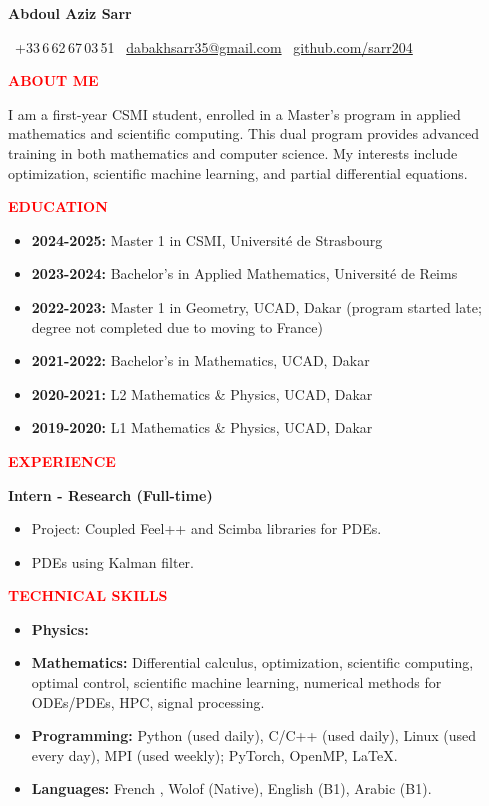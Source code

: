 \documentclass[12pt,a4paper]{article}
\newcommand{\cvsection}[1]{%
  \vspace{10pt}
  \noindent\makebox[\linewidth]{\rule{\textwidth}{1.5pt}}
  \vspace{2pt}
  \noindent\textcolor{red}{\textbf{\LARGE #1}}
  \vspace{2pt}
  \noindent\makebox[\linewidth]{\rule{\textwidth}{0.5pt}}
  \vspace{6pt}
}
\begin{document}
\begin{center}
  {\Huge \textbf{Abdoul Aziz Sarr}}
  
  \faPhone\ +33\,6\,62\,67\,03\,51\quad
  \faEnvelope\ \href{mailto:dabakhsarr35@gmail.com}{dabakhsarr35@gmail.com} \quad
  \faGithub\ \href{https://github.com/sarr204}{github.com/sarr204}
\end{center}

\vspace{10pt}

\cvsection{ABOUT ME}
I am a first-year CSMI student, enrolled in a Master's program in applied mathematics and scientific computing. This dual program provides advanced training in both mathematics and computer science. My interests include optimization, scientific machine learning, and partial differential equations.

\cvsection{EDUCATION}
\begin{itemize}[leftmargin=*,itemsep=3pt]
  \item \textbf{2024-2025:} Master 1 in CSMI, Université de Strasbourg
  \item \textbf{2023-2024:} Bachelor's in Applied Mathematics, Université de Reims
  \item \textbf{2022-2023:} Master 1 in Geometry, UCAD, Dakar (program started late; degree not completed due to moving to France)
  \item \textbf{2021-2022:} Bachelor's in Mathematics, UCAD, Dakar
  \item \textbf{2020-2021:} L2 Mathematics \& Physics, UCAD, Dakar
  \item \textbf{2019-2020:} L1 Mathematics \& Physics, UCAD, Dakar
\end{itemize}

\cvsection{EXPERIENCE}
\textbf{Intern - Research (Full-time)}
\begin{itemize}[leftmargin=*,noitemsep]
  \item Project: Coupled Feel++ and Scimba libraries for PDEs.
  \item PDEs using Kalman filter.
\end{itemize}

\cvsection{TECHNICAL SKILLS}
\begin{itemize}[leftmargin=*,noitemsep]
\item \textbf{Physics:}
  \item \textbf{Mathematics:} Differential calculus, optimization, scientific computing, optimal control, scientific machine learning, numerical methods for ODEs/PDEs, HPC, signal processing.
  \item \textbf{Programming:} Python (used daily), C/C++ (used daily), Linux (used every day), MPI (used weekly); PyTorch, OpenMP, \LaTeX.
  \item \textbf{Languages:} French , Wolof (Native), English (B1), Arabic (B1).
\end{itemize}
\end{document}
